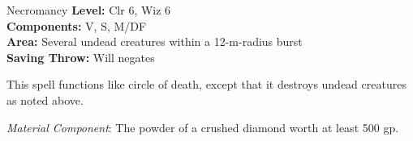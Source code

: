 {Necromancy}
{
	\textbf{Level:}
	Clr 6, Wiz 6\\
	\textbf{Components:}
	V, S, M/DF\\
	\textbf{Area:}
	Several undead creatures within a 12-m-radius burst\\
	\textbf{Saving Throw:}
	Will negates\\
}
{
	This spell functions like circle of death, except that it destroys undead creatures as noted above.

	\textit{Material Component}:
	The powder of a crushed diamond worth at least 500 gp.

}
